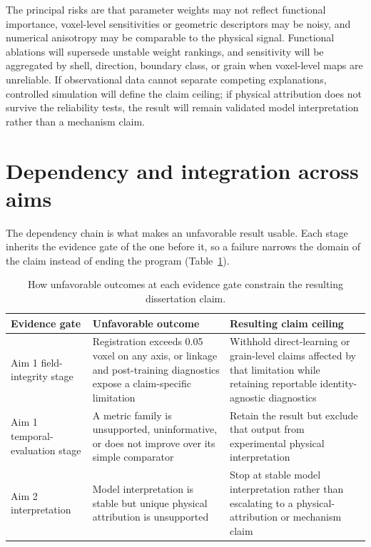 \documentclass[proposalMode]{ufdissertation}
\begin{document}
The principal risks are that parameter weights may not reflect functional importance, voxel-level sensitivities or geometric descriptors may be noisy, and numerical anisotropy may be comparable to the physical signal. Functional ablations will supersede unstable weight rankings, and sensitivity will be aggregated by shell, direction, boundary class, or grain when voxel-level maps are unreliable. If observational data cannot separate competing explanations, controlled simulation will define the claim ceiling; if physical attribution does not survive the reliability tests, the result will remain validated model interpretation rather than a mechanism claim.

\bigskip

\section{Dependency and integration across aims}

The dependency chain is what makes an unfavorable result usable. Each stage inherits the evidence gate of the one before it, so a failure narrows the domain of the claim instead of ending the program (Table~\ref{tab:aim-dependency-outcomes}).

\begin{table}[htbp]
\centering
\caption{How unfavorable outcomes at each evidence gate constrain the resulting dissertation claim.}
\label{tab:aim-dependency-outcomes}
\small
\begin{tabularx}{\textwidth}{@{}>{\raggedright\arraybackslash}p{}X>{\raggedright\arraybackslash}p{}@{}}
\toprule
\textbf{Evidence gate} & \textbf{Unfavorable outcome} & \textbf{Resulting claim ceiling} \\
\midrule
Aim 1 field-integrity stage & Registration exceeds 0.05 voxel on any axis, or linkage and post-training diagnostics expose a claim-specific limitation & Withhold direct-learning or grain-level claims affected by that limitation while retaining reportable identity-agnostic diagnostics \\
Aim 1 temporal-evaluation stage & A metric family is unsupported, uninformative, or does not improve over its simple comparator & Retain the result but exclude that output from experimental physical interpretation \\
Aim 2 interpretation & Model interpretation is stable but unique physical attribution is unsupported & Stop at stable model interpretation rather than escalating to a physical-attribution or mechanism claim \\
\bottomrule
\end{tabularx}
\end{table}
\end{document}
